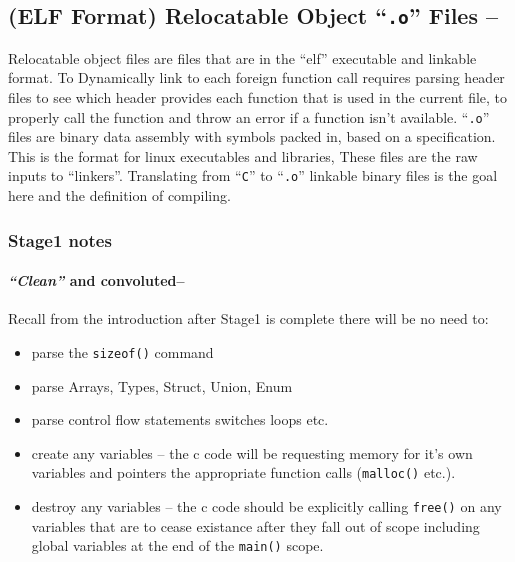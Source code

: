 \hypertarget{elf-format-relocatable-object-.o-files}{%
\subsection{\texorpdfstring{(ELF Format) Relocatable Object
``\texttt{.o}'' Files
--}{(ELF Format) Relocatable Object ``.o'' Files --}}\label{elf-format-relocatable-object-.o-files}}

Relocatable object files are files that are in the ``elf'' executable
and linkable format. To Dynamically link to each foreign function call
requires parsing header files to see which header provides each function
that is used in the current file, to properly call the function and
throw an error if a function isn't available. ``\texttt{.o}'' files are
binary data assembly with symbols packed in, based on a specification.
This is the format for linux executables and libraries, These files are
the raw inputs to ``linkers''. Translating from ``\texttt{C}'' to
``\texttt{.o}'' linkable binary files is the goal here and the
definition of compiling.

\hypertarget{stage1-notes}{%
\subsubsection{Stage1 notes}\label{stage1-notes}}

\hypertarget{clean-and-convoluted}{%
\paragraph{\texorpdfstring{\emph{``Clean''} and
convoluted--}{``Clean'' and convoluted--}}\label{clean-and-convoluted}}

Recall from the introduction after Stage1 is complete there will be no
need to:

\begin{itemize}
\tightlist
\item
  parse the \texttt{sizeof()} command
\item
  parse Arrays, Types, Struct, Union, Enum
\item
  parse control flow statements switches loops etc.
\item
  create any variables -- the c code will be requesting memory for it's
  own variables and pointers the appropriate function calls
  (\texttt{malloc()} etc.).
\item
  destroy any variables -- the c code should be explicitly calling
  \texttt{free()} on any variables that are to cease existance after
  they fall out of scope including global variables at the end of the
  \texttt{main()} scope.
\end{itemize}


